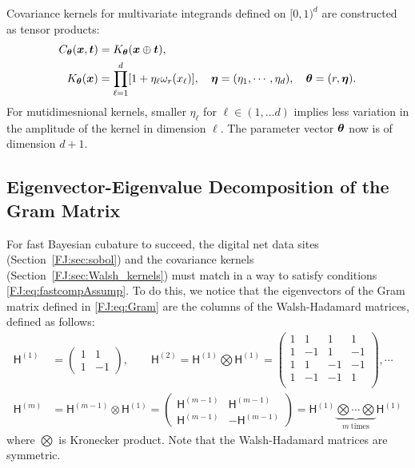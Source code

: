 \documentclass[graybox,footinfo]{svmult}
\begin{document}
Covariance kernels for multivariate integrands defined on $[0,1)^d$ are constructed as tensor products:
\begin{align}
\label{FJ:eqn:digital_shift_in_kernel}
C_{\bstheta}(\bsx, \bst) &= K_{\bstheta} (\bsx \oplus \bst), \\
\label{FJ:eqn:walsh_kernel}
K_{\bstheta} (\bsx) & =  
\prod_{\ell=1}^d  [1 + \eta_\ell \omega_{r} (x_\ell)], \quad \bseta = (\eta_1, \cdots, \eta_d), \quad \bstheta = (r, \bseta).
\end{align}
For mutidimesnional kernels, smaller $\eta_\ell$ for $\ell \in (1, \dots d)$ implies less variation in the amplitude of the kernel in dimension $\ell$.  
The parameter vector ${\boldsymbol{\theta}}$ now is of dimension $d+1$.

\subsection{Eigenvector-Eigenvalue Decomposition of the Gram Matrix}

For fast Bayesian cubature to succeed, the digital net data sites (Section~\ref{FJ:sec:sobol}) and the covariance kernels (Section~\ref{FJ:sec:Walsh_kernels}) must match in a way to satisfy  conditions \eqref{FJ:eq:fastcompAssump}.  To do this, we notice that the eigenvectors of the Gram matrix defined in \eqref{FJ:eq:Gram} are the columns of the Walsh-Hadamard matrices, defined as follows:
\begin{align}
\nonumber
\mathsf{H}^{(1)} &=
\begin{pmatrix}
1 & 1 \\ 1 & -1
\end{pmatrix}, \qquad
\mathsf{H}^{(2)} = \mathsf{H}^{(1)} \bigotimes \mathsf{H}^{(1)} = 
\begin{pmatrix}
1 & 1 & 1 & 1 \\ 
1 & -1 & 1 & -1 \\
1 & 1 & -1 & -1 \\ 
1 & -1 & -1 & 1 \\
\end{pmatrix}, \cdots
\\
\label{FJ:eqn:hadamard_matrix}
\mathsf{H}^{(m)} &= \mathsf{H}^{(m-1)} \otimes \mathsf{H}^{(1)} =
\begin{pmatrix}
\mathsf{H}^{(m-1)} & \mathsf{H}^{(m-1)} \\ \mathsf{H}^{(m-1)} & -\mathsf{H}^{(m-1)}
\end{pmatrix} 
= \mathsf{H}^{(1)} \underbrace{\bigotimes \cdots \bigotimes}_{m \ \text{times}}  \mathsf{H}^{(1)} 
\end{align}
where $\bigotimes$ is Kronecker product.
Note that the Walsh-Hadamard matrices are symmetric.
\end{document}
